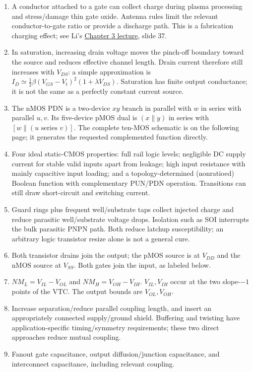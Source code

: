 \documentclass[10pt]{article}
\begin{document}
\begin{enumerate}[label=(\alph*),leftmargin=7mm]
\item A conductor attached to a gate can collect charge during plasma processing and stress/damage thin gate oxide. Antenna rules limit the relevant conductor-to-gate ratio or provide a discharge path. This is a fabrication charging effect; see Li's \href{https://www.ee.ncu.edu.tw/jfli/public_html/VLSI/lecture/ch03.pdf}{Chapter 3 lecture}, slide 37.
\item In saturation, increasing drain voltage moves the pinch-off boundary toward the source and reduces effective channel length. Drain current therefore still increases with $V_{DS}$: a simple approximation is $I_D\simeq\frac12\beta(V_{GS}-V_t)^2(1+\lambda V_{DS})$. Saturation has finite output conductance; it is not the same as a perfectly constant current source.
\item The nMOS PDN is a two-device $xy$ branch in parallel with $w$ in series with parallel $u,v$. Its five-device pMOS dual is $(x\parallel y)$ in series with $[w\parallel(u\text{ series }v)]$. The complete ten-MOS schematic is on the following page; it generates the requested complemented function directly.
\item Four ideal static-CMOS properties: full rail logic levels; negligible DC supply current for stable valid inputs apart from leakage; high input resistance with mainly capacitive input loading; and a topology-determined (nonratioed) Boolean function with complementary PUN/PDN operation. Transitions can still draw short-circuit and switching current.
\item Guard rings plus frequent well/substrate taps collect injected charge and reduce parasitic well/substrate voltage drops. Isolation such as SOI interrupts the bulk parasitic PNPN path. Both reduce latchup susceptibility; an arbitrary logic transistor resize alone is not a general cure.
\item Both transistor drains join the output; the pMOS source is at $V_{DD}$ and the nMOS source at $V_{SS}$. Both gates join the input, as labeled below.
\item $NM_L=V_{IL}-V_{OL}$ and $NM_H=V_{OH}-V_{IH}$. $V_{IL},V_{IH}$ occur at the two slope-$-1$ points of the VTC. The output bounds are $V_{OL},V_{OH}$.
\item Increase separation/reduce parallel coupling length, and insert an appropriately connected supply/ground shield. Buffering and twisting have application-specific timing/symmetry requirements; these two direct approaches reduce mutual coupling.
\item Fanout gate capacitance, output diffusion/junction capacitance, and interconnect capacitance, including relevant coupling.
\end{enumerate}
\end{document}
